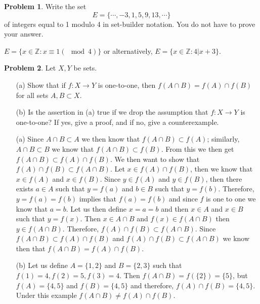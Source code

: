 \documentclass[11pt]{article}
\theoremstyle{definition}
\newtheorem{problem}{Problem}
\begin{document}
\pagebreak

\begin{problem}
Write the set
\[
E = \{ \cdots, -3, 1, 5, 9, 13, \cdots\}
\]
of integers equal to 1 modulo 4 in set-builder notation. You do not have to prove your answer. 
\end{problem}

$E = \{x\in \mathbb{Z}: x\equiv 1(\mod{4})\}$ or alternatively, $E= \{x\in \mathbb{Z}: 4|x+3\}$.

\pagebreak

\begin{problem}
Let $X, Y$ be sets. 
\begin{itemize}
\item[(a)] Show that if $f : X \to Y$ is one-to-one, then $f(A \cap B) = f(A) \cap f(B)$ for all sets $A, B \subset X$. 
\item[(b)] Is the assertion in (a) true if we drop the assumption that $f : X \to Y$ is one-to-one? If yes, give a proof, and if no, give a counterexample. 
\end{itemize}
\end{problem}

\begin{itemize}
    \item[(a)]
    Since $A\cap B\subset A$ we then know that $f(A\cap B)\subset f(A)$; similarly, $A\cap B\subset B$ we know that $f(A\cap B)\subset f(B)$. From this we then get $f(A\cap B)\subset f(A)\cap f(B)$. We then want to show that $f(A)\cap f(B)\subset f(A\cap B)$. Let $x\in f(A)\cap f(B)$, then we know that $x\in f(A)$ and $x\in f(B)$. Since $y\in f(A)$ and $y\in f(B)$, then there exists $a\in A$ such that $y=f(a)$ and $b\in B$ such that $y=f(b)$. Therefore, $y=f(a)=f(b)$ implies that $f(a)=f(b)$ and since $f$ is one to one we know that $a=b.$ Let us then define $x=a=b$ and then $x\in A$ and $x\in B$ such that $y=f(x)$. Then $x\in A\cap B$ and $f(x)\in f(A\cap B)$ then $y\in f(A\cap B).$ Therefore, $f(A)\cap f(B)\subset f(A\cap B)$. Since $f(A\cap B)\subset f(A)\cap f(B)$ and $f(A)\cap f(B)\subset f(A\cap B)$ we know then that $f(A\cap B)= f(A)\cap f(B).$
    
    \item[(b)]
    Let us define $A = \{1, 2\}$ and $B= \{2, 3\}$ such that $f(1)=4, f(2)=5, f(3)=4$. Then $f(A\cap B) = f(\{2\}) = \{5\}$, but $f(A) = \{4, 5\}$ and $f(B) = \{4, 5\}$ and therefore, $f(A)\cap f(B) = \{4, 5\}$. Under this example $f(A\cap B) \neq f(A)\cap f(B)$.
    
\end{itemize}
\pagebreak
\end{document}
